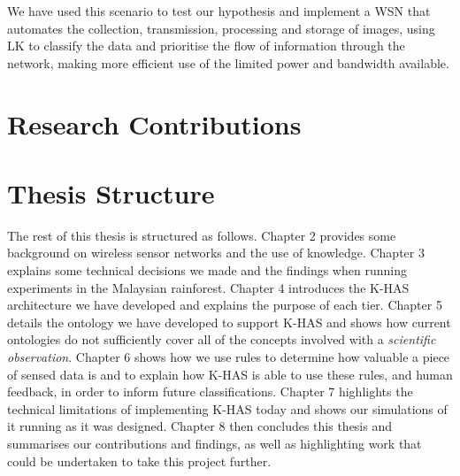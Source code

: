 We have used this scenario to test our hypothesis and implement a WSN that automates the collection, transmission, processing and storage of images, using LK to classify the data and prioritise the flow of information through the network, making more efficient use of the limited power and bandwidth available. 

\section{Research Contributions}

\section{Thesis Structure}
The rest of this thesis is structured as follows. Chapter 2 provides some background on wireless sensor networks and the use of knowledge. Chapter 3 explains some technical decisions we made and the findings when running experiments in the Malaysian rainforest. Chapter 4 introduces the K-HAS architecture we have developed and explains the purpose of each tier. Chapter 5 details the ontology we have developed to support K-HAS and shows how current ontologies do not sufficiently cover all of the concepts involved with a \textit{scientific observation}. Chapter 6 shows how we use rules to determine how valuable a piece of sensed data is and to explain how K-HAS is able to use these rules, and human feedback, in order to inform future classifications. Chapter 7 highlights the technical limitations of implementing K-HAS today and shows our simulations of it running as it was designed. Chapter 8 then concludes this thesis and summarises our contributions and findings, as well as highlighting work that could be undertaken to take this project further.